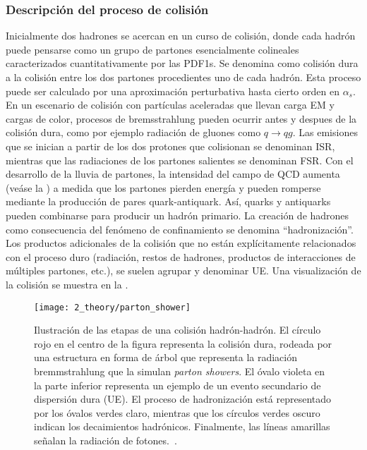 \subsubsection{Descripci\'on del proceso de colisi\'on}

Inicialmente dos hadrones se acercan en un curso de colisión, donde cada hadrón puede pensarse como un grupo de partones esencialmente colineales caracterizados cuantitativamente por las \acp{PDF1}.
Se denomina como colisi\'on dura a la colisi\'on entre los dos partones procedientes uno de cada hadr\'on. Esta proceso puede ser calculado por una aproximación perturbativa hasta cierto orden en \(\alpha_s\).%
En un escenario de colisión con partículas aceleradas que llevan carga \ac{EM} y cargas de color, procesos de bremsstrahlung pueden ocurrir antes y despues de la colisi\'on dura, como por ejemplo radiación de gluones como \(q \to qg\).
Las emisiones que se inician a partir de los dos protones que colisionan se denominan \ac{ISR}, mientras que las radiaciones de los partones salientes se denominan \ac{FSR}. Con el desarrollo de la lluvia de partones, la intensidad del campo de \ac{QCD} aumenta (ve\'ase la \Fig{\ref{fig:theory:sm:mathematical:qcd:alphas}}) a medida que los partones pierden energía y pueden romperse mediante la producción de pares quark-antiquark. Así, quarks y antiquarks pueden combinarse para producir un hadrón primario. La creación de hadrones como consecuencia del fenómeno de confinamiento se denomina \enquote{hadronización}. Los productos adicionales de la colisión que no están explícitamente relacionados con el proceso duro (radiación, restos de hadrones, productos de interacciones de múltiples partones, etc.), se suelen agrupar y denominar \ac{UE}. Una visualización de la colisión \pp se muestra en la \Fig{\ref{fig:theory:sm:hadron_interactions:parton_shower}}.



\begin{figure}[ht!]
    \centering
    \texttt{[image: 2\_theory/parton\_shower]}
    \caption{Ilustraci\'on de las etapas de una colisi\'on hadr\'on-hadr\'on. El c\'irculo rojo en el centro de la figura representa la colisi\'on dura, rodeada por una estructura en forma de \'arbol que representa la radiaci\'on bremmstrahlung que la simulan \textit{parton showers}. El \'ovalo violeta en la parte inferior representa un ejemplo de un evento secundario de dispersi\'on dura (\ac{UE}). El proceso de hadronización está representado por los \'ovalos verdes claro, mientras que los c\'irculos verdes oscuro indican los decaimientos hadrónicos. Finalmente, las líneas amarillas señalan la radiación de fotones.~\cite{Hoche-2015}.}
    \label{fig:theory:sm:hadron_interactions:parton_shower}
\end{figure}



